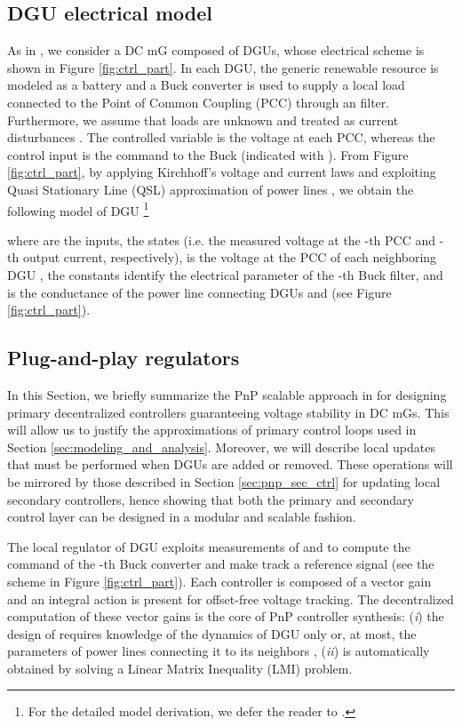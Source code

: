 \documentclass[a4paper]{article}
\theoremstyle{plain}
\begin{document}
\subsection{DGU electrical model}
\label{sec:mG_model}
As in \cite{tucci2015decentralized}, we consider a DC mG composed of
 DGUs, whose electrical scheme is shown
in Figure \ref{fig:ctrl_part}. In each DGU, the generic renewable
resource is modeled as a battery and a Buck converter is
used to supply a local load connected to the Point of Common Coupling
(PCC) through an  filter. 
Furthermore, we assume
that loads  are unknown and treated as current disturbances
\cite{tucci2015decentralized,tucci2016improved}. The controlled variable is the voltage at
each PCC, whereas the control input is the command to the Buck (indicated with ). From Figure \ref{fig:ctrl_part}, by applying Kirchhoff's
voltage and current laws and exploiting Quasi Stationary Line (QSL)
approximation of power lines \cite{tucci2015decentralized,tucci2016improved}, we obtain
the following model of DGU \footnote{For the detailed model
	derivation, we defer the reader to \cite{tucci2015decentralized}.}


where  are the inputs,  the states (i.e. the measured voltage at the -th PCC and -th output current, respectively),  is the voltage at the PCC of each neighboring DGU , the constants  identify the electrical parameter of the -th Buck filter, and  is the conductance of the power line connecting DGUs  and  (see Figure \ref{fig:ctrl_part}).

\subsection{Plug-and-play regulators}
\label{sec:pnp_design}
In this Section, we briefly summarize the PnP scalable approach in
\cite{tucci2015decentralized,tucci2016improved} for designing primary decentralized controllers guaranteeing
voltage stability in DC mGs. This will allow us to justify the approximations of primary control loops used in Section \ref{sec:modeling_and_analysis}. Moreover, we will describe local updates that must be performed when DGUs are added or removed. These operations will be mirrored by those described in Section \ref{sec:pnp_sec_ctrl} for updating local secondary controllers, hence showing that both the primary and secondary control layer can be designed in a modular and scalable fashion. 

The local regulator of DGU 
exploits measurements of  and  to compute the command
 of the -th Buck converter and make  track a
reference signal  (see the scheme in Figure
\ref{fig:ctrl_part}). Each controller is composed of a vector
gain  and an integral action is present for offset-free voltage
tracking. The decentralized computation of these vector gains is the
core of PnP controller synthesis: (\textit{i}) the design of  requires
knowledge of the dynamics of DGU  only \cite{tucci2016improved} or, at most, the parameters of power lines connecting it to its neighbors \cite{tucci2015decentralized}, (\textit{ii})  is automatically
obtained by solving a Linear Matrix Inequality (LMI) problem.
\end{document}
